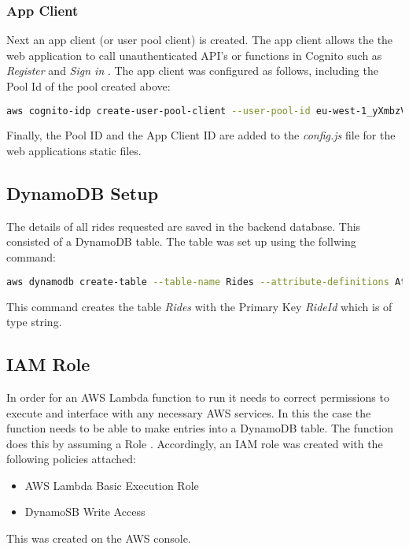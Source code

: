   \subsubsection{App Client}
    
    Next an app client (or user pool client) is created. The app client allows the the web application to call unauthenticated API's or functions in Cognito such as \textit{Register} and \textit{Sign in} \citep{awsAppClient}. The app client was configured as follows, including the Pool Id of the pool created above:
    
    \noindent\begin{minipage}{\textwidth}
      \begin{lstlisting}[caption={Create App Client},label=app-client,language=bash]
      aws cognito-idp create-user-pool-client --user-pool-id eu-west-1_yXmbzV1SM --client-name wild-rydes-web-app --no-generate-secret
      \end{lstlisting}
    \end{minipage}
    
    \noindent 
    Finally, the Pool ID and the App Client ID are added to the \textit{config.js} file for the web applications static files.
    

  \subsection{DynamoDB Setup}
  The details of all rides requested are saved in the backend database. This consisted of a DynamoDB table. The table was set up using the follwing command:

  \noindent\begin{minipage}{\textwidth}
    \begin{lstlisting}[caption={Create DynamoDB Table},label=create-table,language=bash]
    aws dynamodb create-table --table-name Rides --attribute-definitions AttributeName=RideId,AttributeType=S --key-schema AttributeName=RideId,KeyType=HASH --provisioned-throughput ReadCapacityUnits=5,WriteCapacityUnits=5
    \end{lstlisting}
  \end{minipage}
  
  \noindent This command creates the table \textit{Rides} with the Primary Key \textit{RideId} which is of type string.
  
  \subsection{IAM Role}
  In order for an AWS Lambda function to run it needs to correct permissions to execute and interface with any necessary AWS services. In this the case the function needs to be able to make entries into a DynamoDB table. The function does this by assuming a Role \citep{awsLambdaPermission}. Accordingly, an IAM role was created with the following policies attached:
  \begin{itemize}
    \item AWS Lambda Basic Execution Role
    \item DynamoSB Write Access
  \end{itemize}
  This was created on the AWS console.
  
